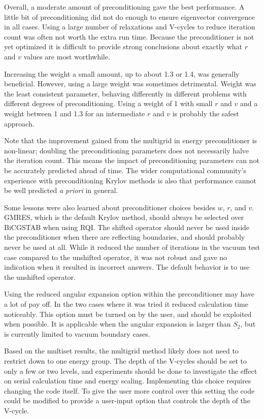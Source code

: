 Overall, a moderate amount of preconditioning gave the best performance. A little bit of preconditioning did not do enough to ensure eigenvector convergence in all cases. Using a large number of relaxations and V-cycles to reduce iteration count was often not worth the extra run time. Because the preconditioner is not yet optimized it is difficult to provide strong conclusions about exactly what $r$ and $v$ values are most worthwhile. 
 
Increasing the weight a small amount, up to about 1.3 or 1.4, was generally beneficial. However, using a large weight was sometimes detrimental. Weight was the least consistent parameter, behaving differently in different problems with different degrees of preconditioning. Using a weight of 1 with small $r$ and $v$ and a weight between 1 and 1.3 for an intermediate $r$ and $v$ is probably the safest approach. 

Note that the improvement gained from the multigrid in energy preconditioner is non-linear; doubling the preconditioning parameters does not necessarily halve the iteration count. This means the impact of preconditioning parameters can not be accurately predicted ahead of time. The wider computational community's experience with preconditioning Krylov methods is also that performance cannot be well predicted \emph{a priori} in general.

Some lessons were also learned about preconditioner choices besides $w$, $r$, and $v$. GMRES, which is the default Krylov method, should always be selected over BiCGSTAB when using RQI. The shifted operator should never be used inside the preconditioner when there are reflecting boundaries, and should probably never be used at all. While it reduced the number of iterations in the vacuum test case compared to the unshifted operator, it was not robust and gave no indication when it resulted in incorrect answers. The default behavior is to use the unshifted operator. 

Using the reduced angular expansion option within the preconditioner may have a lot of pay off. In the two cases where it was tried it reduced calculation time noticeably. This option must be turned on by the user, and should be exploited when possible. It is applicable when the angular expansion is larger than $S_{2}$, but is currently limited to vacuum boundary cases.

Based on the multiset results, the multigrid method likely does not need to restrict down to one energy group. The depth of the V-cycles should be set to only a few or two levels, and experiments should be done to investigate the effect on serial calculation time and energy scaling. Implementing this choice requires changing the code itself. To give the user more control over this setting the code could be modified to provide a user-input option that controls the depth of the V-cycle.


